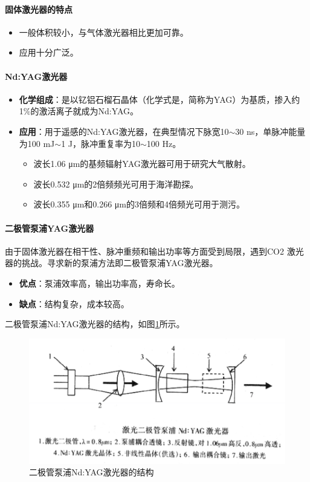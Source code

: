 \paragraph{固体激光器的特点}\begin{itemize}
	\item 一般体积较小，与气体激光器相比更加可靠。
	\item 应用十分广泛。
\end{itemize}

\paragraph{Nd:YAG激光器} \begin{itemize}
	\item \textbf{化学组成}：是以钇铝石榴石晶体（化学式是，简称为YAG）为基质，掺入约1\%的激活离子就成为Nd:YAG。
	\item \textbf{应用}：用于遥感的Nd:YAG激光器，在典型情况下脉宽10$ \sim $30 ns，单脉冲能量为100 mJ$ \sim $1 J，脉冲重复率为10$ \sim $100 Hz。
		\begin{itemize}
			\item 波长1.06 μm的基频辐射YAG激光器可用于研究大气散射。
			\item 波长0.532 μm的2倍频频光可用于海洋勘探。
			\item 波长0.355 μm和0.266 μm的3倍频和4倍频光可用于测污。
		\end{itemize}
\end{itemize}

\paragraph{二极管泵浦YAG激光器}由于固体激光器在相干性、脉冲重频和输出功率等方面受到局限，遇到CO2 激光器的挑战。寻求新的泵浦方法即二极管泵浦YAG激光器。
\begin{itemize}
	\item \textbf{优点}：泵浦效率高，输出功率高，寿命长。
	\item \textbf{缺点}：结构复杂，成本较高。
\end{itemize}
二极管泵浦Nd:YAG激光器的结构，如图\ref{fig:激光二极管泵浦YAG激光器}所示。
\begin{figure}[htbp]
	\centering
	\includegraphics[width=\linewidth]{figure/Chapter2/激光二极管泵浦YAG激光器}
	\caption{二极管泵浦Nd:YAG激光器的结构}
	\label{fig:激光二极管泵浦YAG激光器}
\end{figure}

